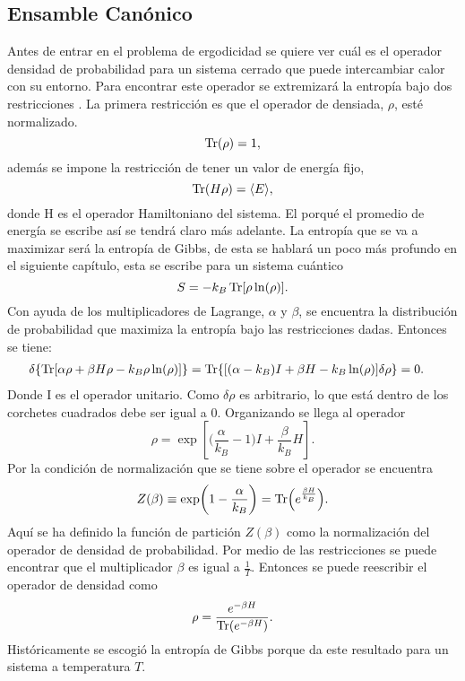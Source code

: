 \subsection{Ensamble Canónico}
Antes de entrar en el problema de ergodicidad se quiere ver cuál es el operador densidad de probabilidad para un sistema cerrado que puede intercambiar calor con su entorno. Para encontrar este operador se extremizará la entropía bajo dos restricciones \cite{ReichlStat}. La primera restricción es que el operador de densiada, $\rho$, esté normalizado.
\begin{equation}
\Tr(\rho)=1,
\end{equation}
además se impone la restricción de tener un valor de energía fijo,
\begin{equation}
\Tr(H \rho)= \langle E \rangle,
\end{equation}
donde H  es el operador Hamiltoniano del sistema. El porqué el promedio de energía se escribe así se tendrá claro más adelante. La entropía que se va a maximizar  será la entropía de Gibbs, de esta se hablará un poco más profundo en el siguiente capítulo, esta se escribe para un sistema cuántico
\begin{equation}
S=-k_{B} \Tr[\rho \ln (\rho)].
\end{equation}
Con ayuda de los multiplicadores de Lagrange, $\alpha$ y $\beta$, se encuentra la distribución de probabilidad que maximiza la entropía bajo las restricciones dadas. Entonces se tiene:
\begin{align}
\delta \{ \Tr [ \alpha \rho + \beta H \rho - k_{B} \rho \ln (\rho)] \} 
&= \Tr \{ [(\alpha - k_{B})I + \beta H - k_{B} \ln (\rho) ] \delta \rho \}=0.
\end{align}
Donde I es el operador unitario. Como $\delta \rho$ es arbitrario, lo que está dentro de los corchetes cuadrados debe ser igual a 0. Organizando se llega al operador
\begin{equation}
\rho= \exp [ \bigg( \frac{ \alpha }{k_{B}}-1 \bigg) I + \frac{\beta}{k_{B}}H ].
\end{equation}
Por la condición de normalización que se tiene sobre el operador se encuentra
\begin{equation}
Z(\beta) \equiv \exp (1- \frac{ \alpha }{k_{B}}) = \Tr (e^{\frac{\beta H}{k_{B}}}).
\end{equation}
Aquí se ha definido la función de partición $Z(\beta)$ como la normalización del operador de densidad de probabilidad. Por medio de las restricciones se puede encontrar que el multiplicador $\beta$ es igual a $\frac{1}{T}$. Entonces se puede reescribir el operador de densidad  como
\begin{equation}
\rho = \frac{ e^{-\beta H}}{\Tr( e^{-\beta H})}.
\end{equation}
Históricamente se escogió la entropía de Gibbs porque da este resultado para un sistema a temperatura $T$.



